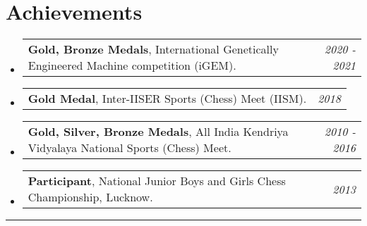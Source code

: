 \documentclass[a4paper,11pt]{article}
\makeatletter
\newcommand{\resumePOR}[3]{
\vspace{0.5mm}\item
    \begin{tabular*}{0.97\textwidth}[t]{l@{\extracolsep{\fill}}r}
        \textbf{#1}, \hspace{0.3mm}#2 & \textit{\small{#3}} 
    \end{tabular*}
    \vspace{-2mm}
}
\newcommand{\resumeSubHeadingListStart}{\begin{itemize}[leftmargin=*,labelsep=0mm]}
\newcommand{\resumeSubHeadingListEnd}{\end{itemize}\vspace{2mm}}
\makeatother
\begin{document}
\section{Achievements}
\vspace{-0.2mm}
\resumeSubHeadingListStart
\resumePOR{Gold, Bronze Medals} %
    {International Genetically Engineered Machine competition (iGEM).} %
    {2020 - 2021} %

\resumePOR{Gold Medal} %
    {Inter-IISER Sports (Chess) Meet (IISM).} %
    {2018} %

\resumePOR{Gold, Silver, Bronze Medals} %
    {All India Kendriya Vidyalaya National Sports (Chess) Meet.} %
    {2010 - 2016} %

\resumePOR{Participant} %
    {National Junior Boys and Girls Chess Championship, Lucknow.} %
    {2013} %

\resumeSubHeadingListEnd
\hspace*{-5mm}\rule{1.035\textwidth}{0.1mm}

\end{document}
